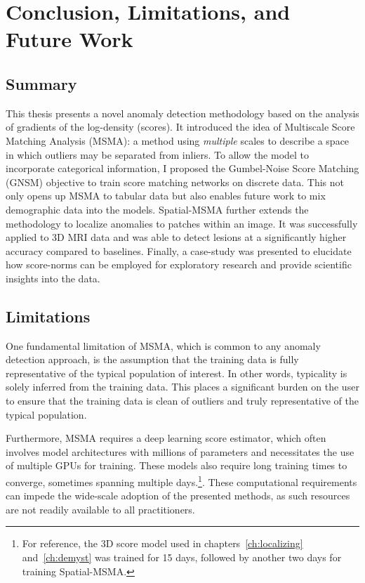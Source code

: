 \chapter{Conclusion, Limitations, and Future Work}
\label{ch:conclusion}

\section{Summary}
This thesis presents a novel anomaly detection methodology based on the analysis of gradients of the log-density (scores). It introduced the idea of Multiscale Score Matching Analysis (MSMA): a method using \textit{multiple} scales to describe a space in which outliers may be separated from inliers.
To allow the model to incorporate categorical information, I proposed the Gumbel-Noise Score Matching (GNSM) objective to train score matching networks on discrete data. This not only opens up MSMA to tabular data but also enables future work to mix demographic data into the models.
Spatial-MSMA further extends the methodology to localize anomalies to patches within an image. It was successfully applied to 3D MRI data and was able to detect lesions at a significantly higher accuracy compared to baselines.
Finally, a case-study was presented to elucidate how score-norms can be employed for exploratory research and provide scientific insights into the data.

\section{Limitations}
One fundamental limitation of MSMA, which is common to any anomaly detection approach, is the assumption that the training data is fully representative of the typical population of interest. In other words, typicality is solely inferred from the training data. This places a significant burden on the user to ensure that the training data is clean of outliers and truly representative of the typical population.

Furthermore, MSMA requires a deep learning score estimator, which often involves model architectures with millions of parameters and necessitates the use of multiple GPUs for training. These models also require long training times to converge, sometimes spanning multiple days.\footnote{For reference, the 3D score model used in chapters~\ref{ch:localizing} and~\ref{ch:demyst} was trained for 15 days, followed by another two days for training Spatial-MSMA. }. These computational requirements can impede the wide-scale adoption of the presented methods, as such resources are not readily available to all practitioners.

